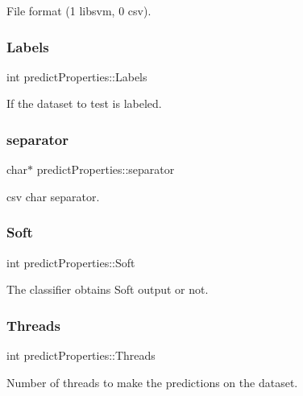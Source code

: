 File format (1 libsvm, 0 csv). \hypertarget{structpredictProperties_a580276e3e15305d5ac16d9ce0eb9b20a}{}\label{structpredictProperties_a580276e3e15305d5ac16d9ce0eb9b20a} 
\subsubsection{\texorpdfstring{Labels}{Labels}}
{\ttfamily int predict\+Properties\+::\+Labels}

If the dataset to test is labeled. \hypertarget{structpredictProperties_a46ba29899b9f858272e17856bbc35876}{}\label{structpredictProperties_a46ba29899b9f858272e17856bbc35876} 
\subsubsection{\texorpdfstring{separator}{separator}}
{\ttfamily char$\ast$ predict\+Properties\+::separator}

csv char separator. \hypertarget{structpredictProperties_a3af58f4dd3147f2896e024e89307f7ac}{}\label{structpredictProperties_a3af58f4dd3147f2896e024e89307f7ac} 
\subsubsection{\texorpdfstring{Soft}{Soft}}
{\ttfamily int predict\+Properties\+::\+Soft}

The classifier obtains Soft output or not. \hypertarget{structpredictProperties_a602116e0d46424243cb4c971c03695e1}{}\label{structpredictProperties_a602116e0d46424243cb4c971c03695e1} 
\subsubsection{\texorpdfstring{Threads}{Threads}}
{\ttfamily int predict\+Properties\+::\+Threads}

Number of threads to make the predictions on the dataset. \hypertarget{structpredictProperties_acd0a668ce39a7201277c247ac177a48f}{}\label{structpredictProperties_acd0a668ce39a7201277c247ac177a48f} 
